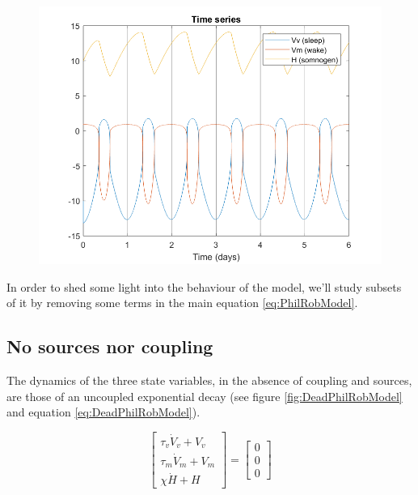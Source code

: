 \documentclass[a4paper, onecolumn, 10pt]{article}
\begin{document}
\begin{figure}[h]
	\begin{center}
		\includegraphics[width=1\columnwidth]{typical.png}
	\end{center}
	\caption{}
	\label{fig:Typical}
\end{figure}

\clearpage

In order to shed some light into the behaviour of the model, we'll study subsets of it by removing some terms in the main equation \ref{eq:PhilRobModel}.

\subsection{No sources nor coupling}
The dynamics of the three state variables, in the absence of coupling and sources, are those of an uncoupled exponential decay (see figure \ref{fig:DeadPhilRobModel} and equation \ref{eq:DeadPhilRobModel}).

\begin{equation}
\label{eq:DeadPhilRobModel}
\left[
\begin{array}{c}
\tau_v \dot V_v + V_v \\ 
\tau_m \dot V_m + V_m \\ 
\chi \dot H + H
\end{array}
\right]
=
\left[
\begin{array}{c}
0 \\ 
0 \\ 
0
\end{array}
\right]
\end{equation}
\end{document}
